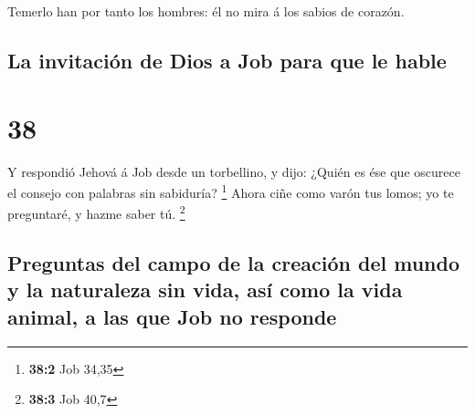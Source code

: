  Temerlo han por tanto los hombres: él no mira á los sabios
de corazón.

\hypertarget{la-invitaciuxf3n-de-dios-a-job-para-que-le-hable}{%
\subsection{La invitación de Dios a Job para que le
hable}\label{la-invitaciuxf3n-de-dios-a-job-para-que-le-hable}}

\hypertarget{section-37}{%
\section{38}\label{section-37}}

 Y respondió Jehová á Job desde un torbellino, y dijo:
 ¿Quién es ése que oscurece el consejo con palabras sin
sabiduría? \footnote{\textbf{38:2} Job 34,35}  Ahora ciñe
como varón tus lomos; yo te preguntaré, y hazme saber tú. \footnote{\textbf{38:3}
  Job 40,7}

\hypertarget{preguntas-del-campo-de-la-creaciuxf3n-del-mundo-y-la-naturaleza-sin-vida-asuxed-como-la-vida-animal-a-las-que-job-no-responde}{%
\subsection{Preguntas del campo de la creación del mundo y la naturaleza
sin vida, así como la vida animal, a las que Job no
responde}\label{preguntas-del-campo-de-la-creaciuxf3n-del-mundo-y-la-naturaleza-sin-vida-asuxed-como-la-vida-animal-a-las-que-job-no-responde}}

